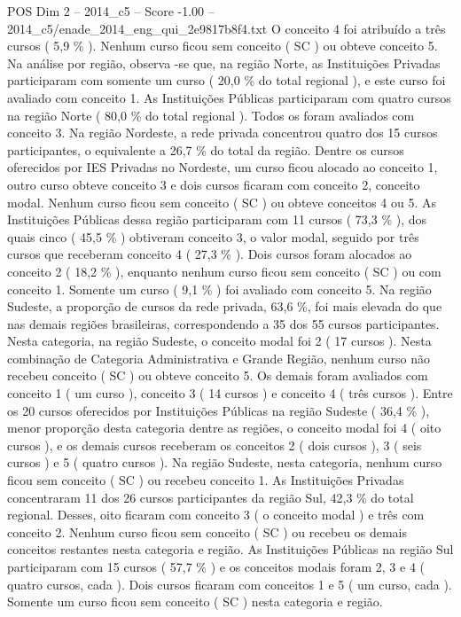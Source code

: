 \begin{textsample}{POS Dim 2 – 2014\_c5 – Score -1.00 – 2014\_c5/enade\_2014\_eng\_qui\_2e9817b8f4.txt}
O conceito 4 foi atribuído a três cursos ( 5,9 \% ).
Nenhum curso ficou sem conceito ( SC ) ou obteve conceito 5.
Na análise por região, observa -se que, na região Norte, as Instituições Privadas participaram com somente um curso ( 20,0 \% do total regional ), e este curso foi avaliado com conceito 1.
As Instituições Públicas participaram com quatro cursos na região Norte ( 80,0 \% do total regional ).
Todos os foram avaliados com conceito 3.
Na região Nordeste, a rede privada concentrou quatro dos 15 cursos participantes, o equivalente a 26,7 \% do total da região.
Dentre os cursos oferecidos por IES Privadas no Nordeste, um curso ficou alocado ao conceito 1, outro curso obteve conceito 3 e dois cursos ficaram com conceito 2, conceito modal.
Nenhum curso ficou sem conceito ( SC ) ou obteve conceitos 4 ou 5.
As Instituições Públicas dessa região participaram com 11 cursos ( 73,3 \% ), dos quais cinco ( 45,5 \% ) obtiveram conceito 3, o valor modal, seguido por três cursos que receberam conceito 4 ( 27,3 \% ).
Dois cursos foram alocados ao conceito 2 ( 18,2 \% ), enquanto nenhum curso ficou sem conceito ( SC ) ou com conceito 1.
Somente um curso ( 9,1 \% ) foi avaliado com conceito 5.
Na região Sudeste, a proporção de cursos da rede privada, 63,6 \%, foi mais elevada do que nas demais regiões brasileiras, correspondendo a 35 dos 55 cursos participantes.
Nesta categoria, na região Sudeste, o conceito modal foi 2 ( 17 cursos ).
Nesta combinação de Categoria Administrativa e Grande Região, nenhum curso não recebeu conceito ( SC ) ou obteve conceito 5.
Os demais foram avaliados com conceito 1 ( um curso ), conceito 3 ( 14 cursos ) e conceito 4 ( três cursos ).
Entre os 20 cursos oferecidos por Instituições Públicas na região Sudeste ( 36,4 \% ), menor proporção desta categoria dentre as regiões, o conceito modal foi 4 ( oito cursos ), e os demais cursos receberam os conceitos 2 ( dois cursos ), 3 ( seis cursos ) e 5 ( quatro cursos ).
Na região Sudeste, nesta categoria, nenhum curso ficou sem conceito ( SC ) ou recebeu conceito 1.
As Instituições Privadas concentraram 11 dos 26 cursos participantes da região Sul, 42,3 \% do total regional.
Desses, oito ficaram com conceito 3 ( o conceito modal ) e três com conceito 2.
Nenhum curso ficou sem conceito ( SC ) ou recebeu os demais conceitos restantes nesta categoria e região.
As Instituições Públicas na região Sul participaram com 15 cursos ( 57,7 \% ) e os conceitos modais foram 2, 3 e 4 ( quatro cursos, cada ).
Dois cursos ficaram com conceitos 1 e 5 ( um curso, cada ).
Somente um curso ficou sem conceito ( SC ) nesta categoria e região.

\end{textsample}
